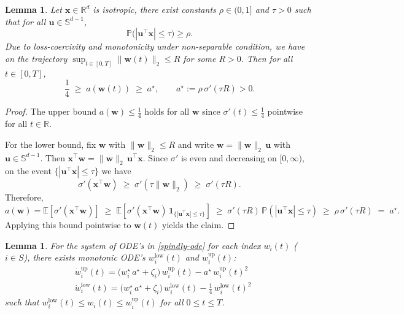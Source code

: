 \documentclass{article}
\theoremstyle{plain}
\newtheorem{lemma}[theorem]{Lemma}
\theoremstyle{definition}
\theoremstyle{remark}
\begin{document}
{\begin{lemma}
\label{lem:curvature_strip}
Let $\boldsymbol x\in\mathbb R^d$ is isotropic,
there exist constants $\rho\in(0,1]$ and $\tau>0$ such that for all
$\boldsymbol u\in\mathbb S^{d-1}$,
\[
\mathbb P\big(|\boldsymbol u^\top \boldsymbol x|\le \tau\big)\ge \rho .
\]
Due to loss-coercivity and monotonicity under non-separable condition, we have on the trajectory $\sup_{t\in[0,T]}\|\boldsymbol w(t)\|_2 \le R$ for some $R>0$. Then for all $t\in[0,T]$,
\[
\frac{1}{4}\;\ge\; a(\boldsymbol w(t))\;\ge\; a^\star,
\qquad
a^\star := \rho\,\sigma'(\tau R)>0.
\]
\end{lemma}
\begin{proof}
The upper bound $a(\boldsymbol w)\le \tfrac14$ holds for all $\boldsymbol w$ since
$\sigma'(t)\le \tfrac14$ pointwise for all $t\in\mathbb R$.

For the lower bound, fix $\boldsymbol w$ with $\|\boldsymbol w\|_2\le R$ and write
$\boldsymbol w=\|\boldsymbol w\|_2\,\boldsymbol u$ with $\boldsymbol u\in\mathbb S^{d-1}$.
Then $\boldsymbol x^\top \boldsymbol w=\|\boldsymbol w\|_2\,\boldsymbol u^\top \boldsymbol x$.
Since $\sigma'$ is even and decreasing on $[0,\infty)$, on the event
$\{|\boldsymbol u^\top \boldsymbol x|\le \tau\}$ we have
\[
\sigma'(\boldsymbol x^\top \boldsymbol w)
\;\ge\;
\sigma'(\tau\|\boldsymbol w\|_2)
\;\ge\;
\sigma'(\tau R).
\]
Therefore,
\[
a(\boldsymbol w)
=
\mathbb E\!\left[\sigma'(\boldsymbol x^\top \boldsymbol w)\right]
\;\ge\;
\mathbb E\!\left[\sigma'(\boldsymbol x^\top \boldsymbol w)\,
\mathbf 1_{\{|\boldsymbol u^\top \boldsymbol x|\le \tau\}}\right]
\;\ge\;
\sigma'(\tau R)\,\mathbb P\!\left(|\boldsymbol u^\top \boldsymbol x|\le \tau\right)
\;\ge\;
\rho\,\sigma'(\tau R)
\;=\;
a^\star.
\]
Applying this bound pointwise to $\boldsymbol w(t)$ yields the claim.
\end{proof}


\begin{lemma}
\label{monotonicity-ode's}
    For the system of ODE's in \eqref{spindly-ode} for each index $w_{i}(t)$ ($i \in S$), there exists monotonic ODE's $w^{\text{low}}_i(t)$ and $w^{\text{up}}_i(t)$:
    \begin{align}
&  \dot w^{\text{up}}_i(t)=   \bigl(w_i^\star\, a^\star + \zeta_i\bigr)\, w^{\text{up}}_i(t)
- a^\star\, w^{\text{up}}_i(t)^2 \\ 
& \dot w^{\text{low}}_i(t)=   \bigl(w_i^\star\, a ^\star + \zeta_i\bigr)\, w^{\text{low}}_i(t)
- \frac{1}{4}\, w^{\text{low}}_i(t)^2
\end{align}    
    such that   
    $w^{\text{low}}_i(t) \leq w_{i}(t) \leq w^{\text{up}}_i(t)$ for all $0 \leq t \leq T$. 
\end{lemma}

}
\end{document}
